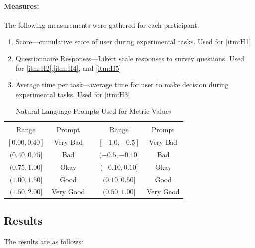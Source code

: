     \paragraph{Measures:}
    The following measurements were gathered for each participant.
    \begin{enumerate}[label=\textbf{M\arabic*}]
        \item Score---cumulative score of user during experimental tasks. Used for \ref{itm:H1}
        \item Questionnaire Responses---Likert scale responses to survey questions. Used for \ref{itm:H2},\ref{itm:H4}, and \ref{itm:H5}
        \item Average time per task---average time for user to make decision during experimental tasks. Used for \ref{itm:H3}
    \end{enumerate}

    \begin{table}[]
        \caption{Natural Language Prompts Used for Metric Values}
        \label{tab:word_ranges}
        \begin{tabular}{cclcc}
            \multicolumn{2}{c}{\xQ{}} & \vline & \multicolumn{2}{c}{\xO{}} \\
            Range & Prompt & \vline & Range & Prompt \\
            \hline
            $[0.00,0.40]$ & Very Bad & \vline & $[-1.0,-0.5]$ & Very Bad \\
            $(0.40,0.75]$ & Bad & \vline & $(-0.5,-0.10]$ & Bad \\
            $(0.75,1.00]$ & Okay & \vline & $(-0.10,0.10]$ & Okay \\
            $(1.00,1.50]$ & Good & \vline & $(0.10,0.50]$ & Good \\
            $(1.50,2.00]$ & Very Good & \vline & $(0.50,1.00]$ & Very Good
        \end{tabular}
    \end{table}

\subsection{Results}
The results are as follows:

